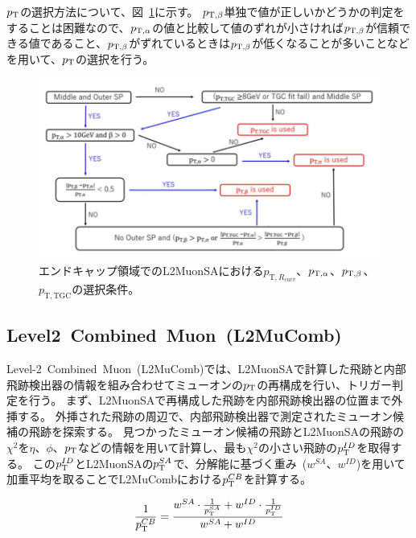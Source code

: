 $p_\mathrm{T}$の選択方法について、図~\ref{fig:3-11}に示す。
$p_{\mathrm{T}, \beta}$単独で値が正しいかどうかの判定をすることは困難なので、$p_{\mathrm{T}, \alpha}$の値と比較して値のずれが小さければ$p_{\mathrm{T}, \beta}$が信頼できる値であること、$p_{\mathrm{T}, \beta}$がずれているときは$p_{\mathrm{T}, \beta}$が低くなることが多いことなどを用いて、$p_\mathrm{T}$の選択を行う。

\begin{figure}[h]
  \centering
  \includegraphics[clip, width=14cm]{fig/3/l2muonSA_pTselection.png}
  \caption{エンドキャップ領域でのL2MuonSAにおける$p_{\mathrm{T},R_{curv}}$、$p_{\mathrm{T}, \alpha}$、$p_{\mathrm{T}, \beta}$、$p_{\mathrm{T,TGC}}$の選択条件\cite{article:wakamiya}。}
  \label{fig:3-11}
\end{figure}


\subsection{Level2~Combined~Muon~(L2MuComb)}\label{chapter3-2-3}
Level-2~Combined~Muon~(L2MuComb)では、L2MuonSAで計算した飛跡と内部飛跡検出器の情報を組み合わせてミューオンの$p_\mathrm{T}$の再構成を行い、トリガー判定を行う。
まず、L2MuonSAで再構成した飛跡を内部飛跡検出器の位置まで外挿する。
外挿された飛跡の周辺で、内部飛跡検出器で測定されたミューオン候補の飛跡を探索する。
見つかったミューオン候補の飛跡とL2MuonSAの飛跡の$\chi^2$を$\eta$、$\phi$、$p_\mathrm{T}$などの情報を用いて計算し、最も$\chi^2$の小さい飛跡の$p_\mathrm{T}^{ID}$を取得する。
この$p_\mathrm{T}^{ID}$とL2MuonSAの$p_\mathrm{T}^{SA}$で、分解能に基づく重み~($w^{SA}$、$w^{ID}$)を用いて加重平均を取ることでL2MuCombにおける$p_\mathrm{T}^{CB}$を計算する。

\begin{equation}
    \frac{1}{p_\mathrm{T}^{C B}}=\frac{w^{S A} \cdot \frac{1}{p_\mathrm{T}^{S A}}+w^{I D} \cdot \frac{1}{p_\mathrm{T}^{I D}}}{w^{S A}+w^{I D}}
\end{equation}

